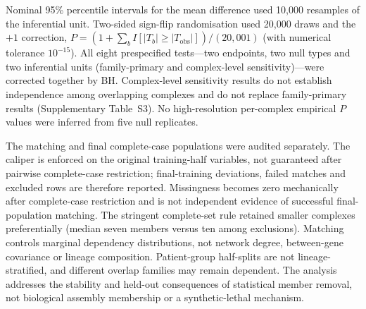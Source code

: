 \documentclass[11pt,letterpaper]{article}
\begin{document}
Nominal 95\% percentile intervals for the mean difference used 10{,}000
resamples of the inferential unit. Two-sided sign-flip randomisation used
20{,}000 draws and the $+1$ correction,
$P=(1+\sum_b I[|T_b|\geq|T_{\mathrm{obs}}|])/(20{,}001)$
(with numerical tolerance $10^{-15}$). All eight prespecified tests---two
endpoints, two null types and two inferential units (family-primary and
complex-level sensitivity)---were corrected together by BH. Complex-level
sensitivity results do not establish independence among overlapping
complexes and do not replace family-primary results (Supplementary Table~S3).
No high-resolution per-complex empirical $P$ values were inferred from five
null replicates.

The matching and final complete-case populations were audited separately.
The caliper is enforced on the original training-half variables, not
guaranteed after pairwise complete-case restriction; final-training deviations,
failed matches and excluded rows are therefore reported. Missingness becomes
zero mechanically after complete-case restriction and is not independent
evidence of successful final-population matching. The stringent complete-set
rule retained smaller complexes preferentially (median seven members versus
ten among exclusions). Matching controls marginal dependency distributions,
not network degree, between-gene covariance or lineage composition.
Patient-group half-splits are not lineage-stratified, and different overlap
families may remain dependent. The analysis addresses the stability and
held-out consequences of statistical member removal, not biological assembly
membership or a synthetic-lethal mechanism.
\end{document}
